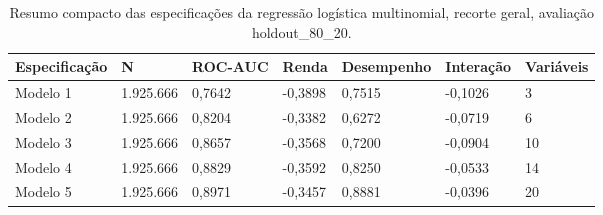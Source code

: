 \begin{table}
\caption{Resumo compacto das especificações da regressão logística multinomial, recorte geral, avaliação holdout_80_20.}
\label{tab:tabela_compacta_logit_ternario_recorte_geral_holdout_80_20}
\begin{tabular}{lllllll}
\toprule
Especificação & N & ROC-AUC & Renda & Desempenho & Interação & Variáveis \\
\midrule
Modelo 1 & 1.925.666 & 0,7642 & -0,3898 & 0,7515 & -0,1026 & 3 \\
Modelo 2 & 1.925.666 & 0,8204 & -0,3382 & 0,6272 & -0,0719 & 6 \\
Modelo 3 & 1.925.666 & 0,8657 & -0,3568 & 0,7200 & -0,0904 & 10 \\
Modelo 4 & 1.925.666 & 0,8829 & -0,3592 & 0,8250 & -0,0533 & 14 \\
Modelo 5 & 1.925.666 & 0,8971 & -0,3457 & 0,8881 & -0,0396 & 20 \\
\bottomrule
\end{tabular}
\end{table}
